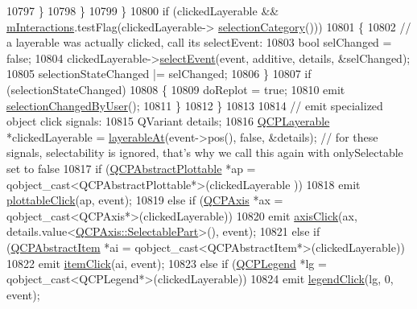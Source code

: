 \begin{DoxyCode}
10797           \}
10798         \}
10799       \}
10800       \textcolor{keywordflow}{if} (clickedLayerable && \hyperlink{class_q_custom_plot_ad717377ceba7493b4b32f0bcbbdf1895}{mInteractions}.testFlag(clickedLayerable->
      \hyperlink{class_q_c_p_layerable_aa4035e586b7f317a06ba7e74e242a5ea}{selectionCategory}()))
10801       \{
10802         \textcolor{comment}{// a layerable was actually clicked, call its selectEvent:}
10803         \textcolor{keywordtype}{bool} selChanged = \textcolor{keyword}{false};
10804         clickedLayerable->\hyperlink{class_q_c_p_layerable_a7498c2d0d081cf7cad0fb3bb93aa0e91}{selectEvent}(event, additive, details, &selChanged);
10805         selectionStateChanged |= selChanged;
10806       \}
10807       \textcolor{keywordflow}{if} (selectionStateChanged)
10808       \{
10809         doReplot = \textcolor{keyword}{true};
10810         emit \hyperlink{class_q_custom_plot_a500c64a109bc773c973ad274f2fa4190}{selectionChangedByUser}();
10811       \}
10812     \}
10813     
10814     \textcolor{comment}{// emit specialized object click signals:}
10815     QVariant details;
10816     \hyperlink{class_q_c_p_layerable}{QCPLayerable} *clickedLayerable = \hyperlink{class_q_custom_plot_a3fffd1d8364f657482ae985e0b5aa028}{layerableAt}(event->pos(), \textcolor{keyword}{false}, &details); \textcolor{comment}{//
       for these signals, selectability is ignored, that's why we call this again with onlySelectable set to false}
10817     \textcolor{keywordflow}{if} (\hyperlink{class_q_c_p_abstract_plottable}{QCPAbstractPlottable} *ap = qobject\_cast<QCPAbstractPlottable*>(clickedLayerable
      ))
10818       emit \hyperlink{class_q_custom_plot_a57e5efa8a854620e9bf62d31fc139f53}{plottableClick}(ap, event);
10819     \textcolor{keywordflow}{else} \textcolor{keywordflow}{if} (\hyperlink{class_q_c_p_axis}{QCPAxis} *ax = qobject\_cast<QCPAxis*>(clickedLayerable))
10820       emit \hyperlink{class_q_custom_plot_abf635f8b56ab5c16d5de9f358543e82b}{axisClick}(ax, details.value<\hyperlink{class_q_c_p_axis_abee4c7a54c468b1385dfce2c898b115f}{QCPAxis::SelectablePart}>(), event);
10821     \textcolor{keywordflow}{else} \textcolor{keywordflow}{if} (\hyperlink{class_q_c_p_abstract_item}{QCPAbstractItem} *ai = qobject\_cast<QCPAbstractItem*>(clickedLayerable))
10822       emit \hyperlink{class_q_custom_plot_ae16b51f52d2b7aebbc7e3e74e6ff2e4b}{itemClick}(ai, event);
10823     \textcolor{keywordflow}{else} \textcolor{keywordflow}{if} (\hyperlink{class_q_c_p_legend}{QCPLegend} *lg = qobject\_cast<QCPLegend*>(clickedLayerable))
10824       emit \hyperlink{class_q_custom_plot_a79cff0baafbca10a3aaf694d2d3b9ab3}{legendClick}(lg, 0, event);

\end{DoxyCode}

